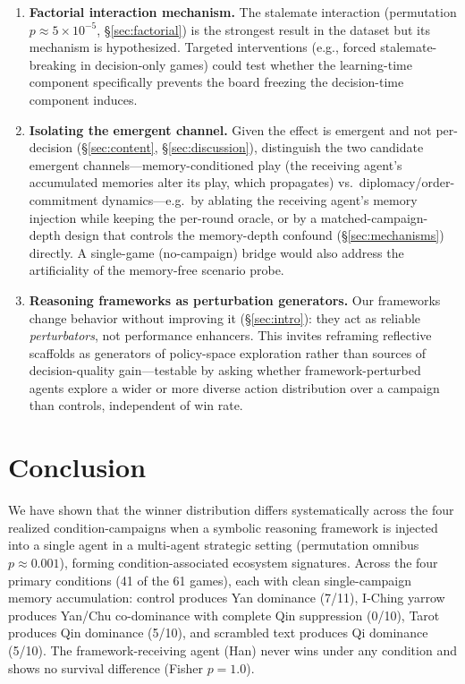 \documentclass[11pt]{article}
\begin{document}
\begin{enumerate}
\item \textbf{Factorial interaction mechanism.} The stalemate interaction (permutation $p \approx 5\times10^{-5}$, \S\ref{sec:factorial}) is the strongest result in the dataset but its mechanism is hypothesized. Targeted interventions (e.g., forced stalemate-breaking in decision-only games) could test whether the learning-time component specifically prevents the board freezing the decision-time component induces.
\item \textbf{Isolating the emergent channel.} Given the effect is emergent and not per-decision (\S\ref{sec:content}, \S\ref{sec:discussion}), distinguish the two candidate emergent channels---memory-conditioned play (the receiving agent's accumulated memories alter its play, which propagates) vs.\ diplomacy/order-commitment dynamics---e.g.\ by ablating the receiving agent's memory injection while keeping the per-round oracle, or by a matched-campaign-depth design that controls the memory-depth confound (\S\ref{sec:mechanisms}) directly. A single-game (no-campaign) bridge would also address the artificiality of the memory-free scenario probe.
\item \textbf{Reasoning frameworks as perturbation generators.} Our frameworks change behavior without improving it (\S\ref{sec:intro}): they act as reliable \emph{perturbators}, not performance enhancers. This invites reframing reflective scaffolds as generators of policy-space exploration rather than sources of decision-quality gain---testable by asking whether framework-perturbed agents explore a wider or more diverse action distribution over a campaign than controls, independent of win rate.
\end{enumerate}


\section{Conclusion}
\label{sec:conclusion}

We have shown that the winner distribution differs systematically across the four realized condition-campaigns when a symbolic reasoning framework is injected into a single agent in a multi-agent strategic setting (permutation omnibus $p \approx 0.001$), forming condition-associated ecosystem signatures. Across the four primary conditions (41 of the 61 games), each with clean single-campaign memory accumulation: control produces Yan dominance (7/11), I-Ching yarrow produces Yan/Chu co-dominance with complete Qin suppression (0/10), Tarot produces Qin dominance (5/10), and scrambled text produces Qi dominance (5/10). The framework-receiving agent (Han) never wins under any condition and shows no survival difference (Fisher $p = 1.0$).
\end{document}
